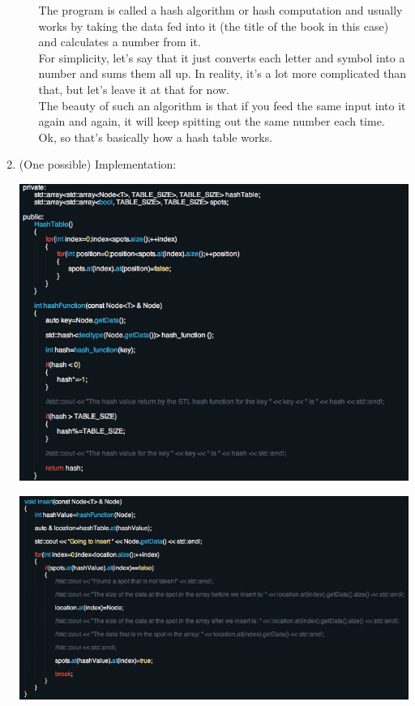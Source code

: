 \documentclass [12pt, executivepaper]{article}
\begin{document}
\begin{enumerate}
\begin{enumerate}
The program is called a hash algorithm or hash computation and usually works by taking the data fed into it (the title of the book in this case) and calculates a number from it.\\

For simplicity, let's say that it just converts each letter and symbol into a number and sums them all up. In reality, it's a lot more complicated than that, but let's leave it at that for now.\\

The beauty of such an algorithm is that if you feed the same input into it again and again, it will keep spitting out the same number each time.\\

Ok, so that's basically how a hash table works.

\end{enumerate}

\item (One possible) Implementation:

\begin{adjustbox}{max height=2in, max width=2in}



\end{adjustbox}

\pagebreak

\vspace*{-40mm}

\includegraphics[scale=0.5]{HashTableHeaderfilePart1}

\includegraphics[scale=0.5]{HashTableHeaderfilePart2}


\end{enumerate}
\end{document}
